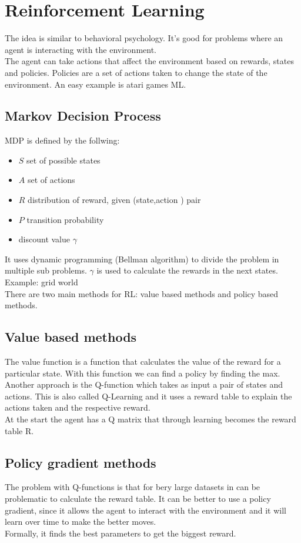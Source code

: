 \chapter{Reinforcement Learning}
The idea is similar to behavioral psychology. It's good for problems where an agent is interacting with the environment. \\
The agent can take actions that affect the environment based on rewards, states and policies. Policies are a set of actions taken to change the state of the environment. An easy example is atari games ML. 
\section{Markov Decision Process}
MDP is defined by the follwing:
\begin{itemize}
	\item $S$ set of possible states
	\item $A$ set of actions
	\item $R$ distribution of reward, given (state,action ) pair
	\item $P$ transition probability 
	\item discount value $\gamma$
\end{itemize}

It uses dynamic programming (Bellman algorithm) to divide the problem in multiple sub problems. $\gamma$ is used to calculate the rewards in the next states.
Example: grid world
\\
There are two main methods for RL: value based methods and policy based methods.

\section{Value based methods}
The value function is a function that calculates the value of the reward for a particular state. With this function we can find a policy by finding the max. \\
Another approach is the Q-function which takes as input a pair of states and actions. This is also called Q-Learning and it uses a reward table to explain the actions taken and the respective reward. \\
At the start the agent has a Q matrix that through learning becomes the reward table R.
\section{Policy gradient methods}
The problem with Q-functions is that for bery large datasets in can be problematic to calculate the reward table. It can be better to use a policy gradient, since it allows the agent to interact with the environment and it will learn over time to make the better moves.\\
Formally, it finds the best parameters to get the biggest reward.